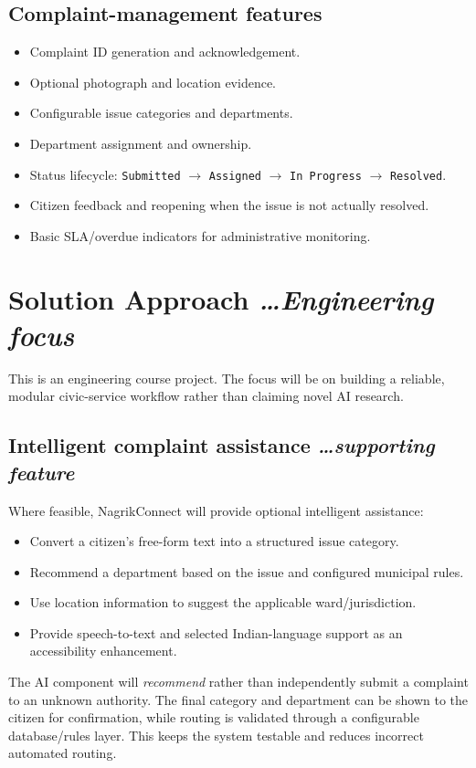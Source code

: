 \documentclass[11pt,a4paper]{article}
\newcommand{\BvrHint}[1]{{\normalfont\normalsize\itshape\hfill #1}}
\begin{document}
\subsection{Complaint-management features}
\begin{itemize}[leftmargin=0.7cm]
    \item Complaint ID generation and acknowledgement.
    \item Optional photograph and location evidence.
    \item Configurable issue categories and departments.
    \item Department assignment and ownership.
    \item Status lifecycle: \texttt{Submitted} $\rightarrow$ \texttt{Assigned} $\rightarrow$ \texttt{In Progress} $\rightarrow$ \texttt{Resolved}.
    \item Citizen feedback and reopening when the issue is not actually resolved.
    \item Basic SLA/overdue indicators for administrative monitoring.
\end{itemize}

\section{Solution Approach %
\BvrHint{\ldots Engineering focus}}
This is an engineering course project. The focus will be on building a reliable, modular civic-service workflow rather than claiming novel AI research.

\subsection{Intelligent complaint assistance %
\BvrHint{\ldots supporting feature}}
Where feasible, NagrikConnect will provide optional intelligent assistance:
\begin{itemize}[leftmargin=0.7cm]
    \item Convert a citizen's free-form text into a structured issue category.
    \item Recommend a department based on the issue and configured municipal rules.
    \item Use location information to suggest the applicable ward/jurisdiction.
    \item Provide speech-to-text and selected Indian-language support as an accessibility enhancement.
\end{itemize}

The AI component will \emph{recommend} rather than independently submit a complaint to an unknown authority. The final category and department can be shown to the citizen for confirmation, while routing is validated through a configurable database/rules layer. This keeps the system testable and reduces incorrect automated routing.
\end{document}
